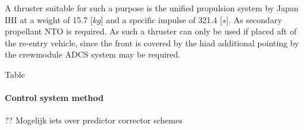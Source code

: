 A thruster suitable for such a purpose is the unified propulsion system by Japan IHI at a weight of 15.7 [$kg$] and a specific impulse of 321.4 [$s$]. As secondary propellant NTO is required. As such a thruster can only be used if placed aft of the re-entry vehicle, since the front is covered by the \gls{hiad} additional pointing by the crewmodule ADCS system may be required.

Table 



\paragraph{Control system method}

?? Mogelijk iets over predictor corrector schemes




